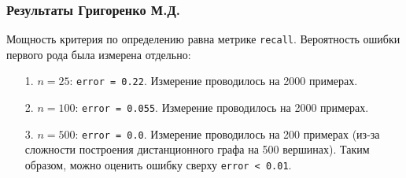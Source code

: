 \documentclass[a4paper,12pt]{article}
\begin{document}
\subsubsection*{Результаты Григоренко М.Д.}
Мощность критерия по определению равна метрике \texttt{recall}. Вероятность ошибки первого рода была измерена отдельно:
\begin{itemize}
    \item[1.] $n = 25$: \texttt{error = 0.22}. Измерение проводилось на 2000 примерах.
    \item[2.] $n = 100$: \texttt{error = 0.055}. Измерение проводилось на 2000 примерах.
    \item[3.] $n = 500$: \texttt{error = 0.0}. Измерение проводилось на 200 примерах (из-за сложности построения дистанционного графа на 500 вершинах). Таким образом, можно оценить ошибку сверху \texttt{error < 0.01}.
\end{itemize}
\end{document}
